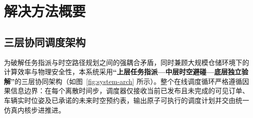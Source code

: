 \section{解决方法概要}
\label{sec:methodology}

\subsection{三层协同调度架构}

为破解任务指派与时空路径规划之间的强耦合矛盾，同时兼顾大规模仓储环境下的计算效率与物理安全性，本系统采用\textbf{“上层任务指派—中层时空避碰—底层独立验解”}的三层协同架构（如图~\ref{fig:system-arch} 所示）。整个在线调度循环严格遵循因果信息边界：在每个离散时间步，调度器仅接收当前已发布且未完成的可见订单、车辆实时位姿及已承诺的未来时空预约表，输出原子可执行的调度计划并交由统一仿真内核步进推进。

